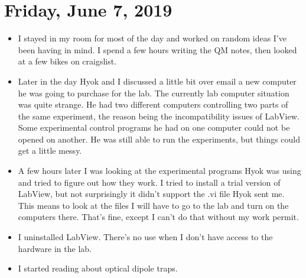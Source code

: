 \documentclass{book}
\theoremstyle{definition}
\begin{document}
\section*{Friday, June 7, 2019}
\begin{itemize}
	\item I stayed in my room for most of the day and worked on random ideas I've been having in mind. I spend a few hours writing the QM notes, then looked at a few bikes on craigslist. 
	
	\item Later in the day Hyok and I discussed a little bit over email a new computer he was going to purchase for the lab. The currently lab computer situation was quite strange. He had two different computers controlling two parts of the same experiment, the reason being the incompatibility issues of LabView. Some experimental control programs he had on one computer could not be opened on another. He was still able to run the experiments, but things could get a little messy. 
	
	\item A few hours later I was looking at the experimental programs Hyok was using and tried to figure out how they work. I tried to install a trial version of LabView, but not surprisingly it didn't support the .vi file Hyok sent me. This means to look at the files I will have to go to the lab and turn on the computers there. That's fine, except I can't do that without my work permit.
	
	\item I uninstalled LabView. There's no use when I don't have access to the hardware in the lab. 
	
	\item I started reading about optical dipole traps. 
\end{itemize}
\end{document}
